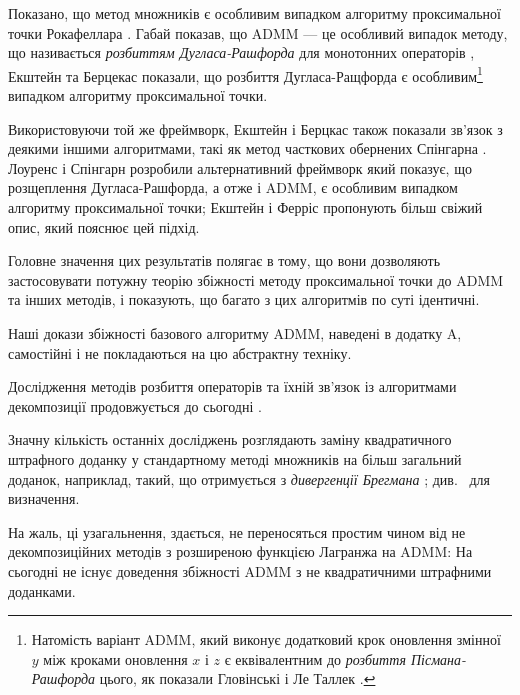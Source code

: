 Показано, що метод множників є особливим випадком алгоритму проксимальної точки Рокафеллара \cite{141}. Габай \cite{81} показав, що ADMM --- це особливий випадок методу, що називається \textit{розбиттям Дугласа-Рашфорда} для монотонних операторів \cite{53, 112}, Екштейн та Берцекас \cite{63} показали, що розбиття Дугласа-Ращфорда є особливим\footnote{Натомість варіант ADMM, який виконує додатковий крок оновлення змінної $y$ між кроками оновлення $x$ і $z$ є еквівалентним  до \textit{розбиття Пісмана-Рашфорда} \cite{137, 112} цього, як показали Гловінські і Ле Таллек \cite{87}.} випадком алгоритму проксимальної точки. \medskip

Використовуючи той же фреймворк, Екштейн і Берцкас \cite{63} також показали зв'язок з деякими іншими алгоритмами, такі як метод часткових обернених Спінгарна \cite{153}. Лоуренс і Спінгарн \cite{108} розробили альтернативний фреймворк який показує, що розщеплення Дугласа-Рашфорда, а отже і ADMM, є особливим випадком алгоритму проксимальної  точки; Екштейн і Ферріс \cite{64} пропонують більш свіжий опис, який пояснює цей підхід. \medskip

Головне значення цих результатів полягає в тому, що вони дозволяють застосовувати потужну теорію збіжності методу проксимальної точки до ADMM та інших методів, і показують, що багато з цих алгоритмів по суті ідентичні.

\begin{remark}
    Наші докази збіжності базового алгоритму ADMM, наведені в додатку A, самостійні і не покладаються на цю абстрактну техніку.
\end{remark}

Дослідження методів розбиття операторів та їхній зв'язок із алгоритмами декомпозиції продовжується до сьогодні \cite{66, 67}. \medskip

Значну кількість останніх досліджень розглядають заміну квадратичного штрафного доданку у стандартному методі множників на більш загальний доданок, наприклад, такий, що отримується з \textit{дивергенції Брегмана} \cite{30, 58}; див.~\cite{22} для визначення. \medskip

На жаль, ці узагальнення, здається, не переносяться простим чином від не декомпозиційних методів з розширеною функцією Лагранжа на ADMM: На сьогодні не існує доведення збіжності ADMM з не квадратичними штрафними доданками.